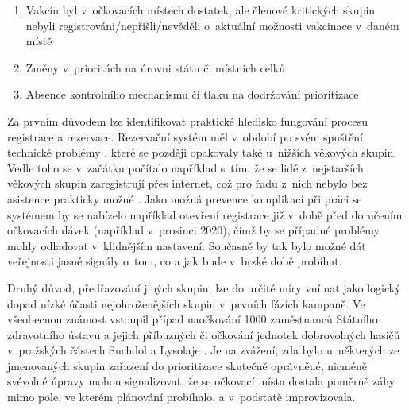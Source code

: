 \begin{enumerate}
\item Vakcín byl v~očkovacích místech dostatek, ale členové kritických skupin nebyli registrováni/nepřišli/nevěděli o~aktuální možnosti vakcinace v~daném místě \cite{logo_nahoda, lochar_karban} 
\item Změny v~prioritách na úrovni státu či místních celků \cite{logo_logistika, logo_pardubice}
\item Absence kontrolního mechanismu či tlaku na dodržování prioritizace \cite{logo_predbihani, lochar_karban}
\end{enumerate}


Za prvním důvodem lze identifikovat praktické hledisko fungování procesu registrace a rezervace.
Rezervační systém měl v~období po svém spuštění technické problémy \cite{logoc_seniori_zapsani, logoc_stres}, které se později opakovaly také u~nižších vě\-ko\-vých skupin. 
Vedle toho se v~začátku počítalo například s~tím, že se lidé z~nejstarších věkových skupin zaregistrují přes internet, což pro řadu z~nich nebylo bez asistence prakticky možné \cite{seniori_registrace_internet}.
%
Jako možná prevence komplikací při práci se systémem by se nabízelo například otevření registrace již v~době před doručením očkovacích dávek (například v~prosinci 2020), čímž by se případné problémy mohly odlaďovat v~klidnějším nastavení. %
Současně by tak bylo možné dát veřejnosti jasné signály o~tom, co a jak bude v~brzké době probíhat.

Druhý důvod, předřazování jiných skupin, lze do určité míry vnímat jako logický dopad nízké účasti nejohroženějších skupin v~prvních fázích kampaně.
%
Ve všeobecnou známost vstoupil případ naočkování 1000 zaměstnanců Státního zdravotního ústavu a jejich příbuzných či očkování jednotek dobrovolných hasičů v~pražských částech Suchdol a Lysolaje \cite{logoc_nebudu, logoc_hasici}. Je na zvážení, zda bylo u~některých ze jmenovaných skupin zařazení do prioritizace skutečně oprávněné, nicméně svévolné úpravy mohou signalizovat, že se očkovací místa dostala poměrně záhy mimo pole, ve kterém plánování probíhalo, a v~podstatě improvizovala. 

